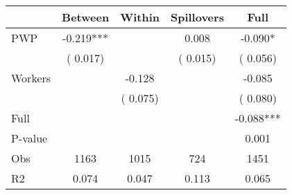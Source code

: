 
\begin{tabular}{l*{4}{c}}\hline&\multicolumn{1}{c}{Between}&\multicolumn{1}{c}{Within}&\multicolumn{1}{c}{Spillovers}&\multicolumn{1}{c}{Full}\\ \hline
 PWP           &             -0.219***      &                                               &        0.008 &        -0.090*                            \\ 
                               &        (       0.017)           &                                       &       (       0.015)     &      (       0.056)                                           \\ 
 Workers       &                                               &       -0.128    &                                &            -0.085                            \\ 
                               &                                               & (       0.075)                  &                                        &      (       0.080)                                           \\ 
\hline                                                                                                                                                                                                                                            
 Full                  &                                               &                                               &                                        &            -0.088***                                     \\ 
 P-value               &                                               &                                               &                                        &             0.001                                           \\ 
 Obs                   &               1163               &       1015                       &       724                &              1451                                               \\ 
 R2                    &                      0.074              &              0.047                      &              0.113               &                     0.065                                              \\ 
\hline \end{tabular}                                                                                                                                                                                                              